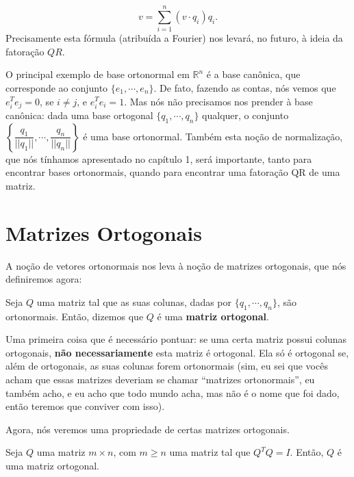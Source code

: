 $$
v = \sum\limits_{i = 1}^{n} (v\cdot q_i)q_i.
$$
Precisamente esta fórmula (atribuída a Fourier) nos levará, no futuro, à ideia da fatoração $QR$.

O principal exemplo de base ortonormal em $\mathbb{R}^n$ é a base canônica, que corresponde ao conjunto $\{e_1, \cdots, e_n\}$. De fato, fazendo as contas, nós vemos que $e_i^Te_j = 0$, se $i\neq j$, e $e_i^Te_i = 1$. Mas nós não precisamos nos prender à base canônica: dada uma base ortogonal $\{q_1, \cdots, q_n\}$ qualquer, o conjunto $\left\{\dfrac{q_1}{||q_1||}, \cdots, \dfrac{q_n}{||q_n||}\right\}$ é uma base ortonormal. Também esta noção de normalização, que nós tínhamos apresentado no capítulo 1, será importante, tanto para encontrar bases ortonormais, quando para encontrar uma fatoração QR de uma matriz.

\section{Matrizes Ortogonais}

A noção de vetores ortonormais nos leva à noção de matrizes ortogonais, que nós definiremos agora:

\begin{Definition}
	Seja $Q$ uma matriz tal que as suas colunas, dadas por $\{q_1, \cdots, q_n\}$, são ortonormais. Então, dizemos que $Q$ é uma \textbf{matriz ortogonal}.
\end{Definition}

Uma primeira coisa que é necessário pontuar: se uma certa matriz possui colunas ortogonais, \textbf{não necessariamente} esta matriz é ortogonal. Ela só é ortogonal se, além de ortogonais, as suas colunas forem ortonormais (sim, eu sei que vocês acham que essas matrizes deveriam se chamar ``matrizes ortonormais'', eu também acho, e eu acho que todo mundo acha, mas não é o nome que foi dado, então teremos que conviver com isso).

Agora, nós veremos uma propriedade de certas matrizes ortogonais.

\begin{Proposition}
	Seja $Q$ uma matriz $m\times n$, com $m\geq n$ uma matriz tal que $Q^TQ = I$. Então, $Q$ é uma matriz ortogonal.
\end{Proposition}

